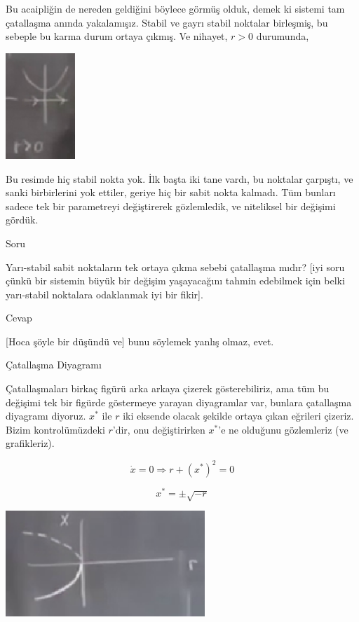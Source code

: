 \documentclass[12pt,fleqn]{article}\usepackage{../../common}
\begin{document}
Bu acaipliğin de nereden geldiğini böylece görmüş olduk, demek ki sistemi tam
çatallaşma anında yakalamışız. Stabil ve gayrı stabil noktalar birleşmiş, bu
sebeple bu karma durum ortaya çıkmış. Ve nihayet, $r>0$ durumunda,

\includegraphics[height=4cm]{02_13.png}

Bu resimde hiç stabil nokta yok. İlk başta iki tane vardı, bu noktalar çarpıştı,
ve sanki birbirlerini yok ettiler, geriye hiç bir sabit nokta kalmadı. Tüm
bunları sadece tek bir parametreyi değiştirerek gözlemledik, ve niteliksel bir
değişimi gördük.

Soru

Yarı-stabil sabit noktaların tek ortaya çıkma sebebi çatallaşma mıdır? [iyi soru
çünkü bir sistemin büyük bir değişim yaşayacağını tahmin edebilmek için belki
yarı-stabil noktalara odaklanmak iyi bir fikir].

Cevap

[Hoca şöyle bir düşündü ve] bunu söylemek yanlış olmaz, evet.

Çatallaşma Diyagramı

Çatallaşmaları birkaç figürü arka arkaya çizerek gösterebiliriz, ama tüm bu
değişimi tek bir figürde göstermeye yarayan diyagramlar var, bunlara çatallaşma
diyagramı diyoruz. $x^\ast$ ile $r$ iki eksende olacak şekilde ortaya çıkan
eğrileri çizeriz. Bizim kontrolümüzdeki $r$'dir, onu değiştirirken $x^\ast$'e ne
olduğunu gözlemleriz (ve grafikleriz).

$$ \dot{x}=0 \Rightarrow r + (x^\ast)^2 = 0  $$

$$ x^\ast = \pm \sqrt{-r} $$

\includegraphics[height=4cm]{02_14.png}
\end{document}

